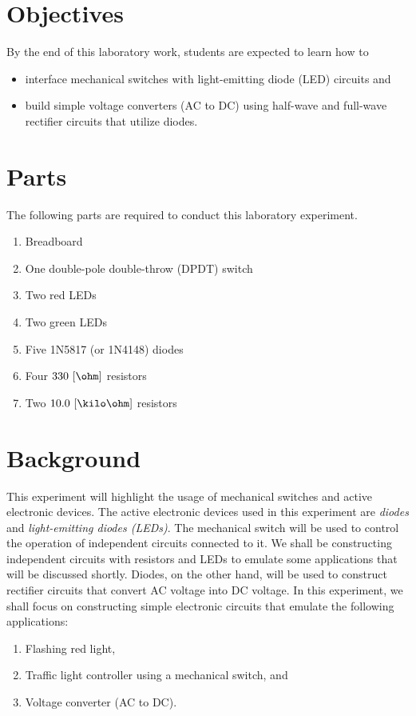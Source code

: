 \section{Objectives}
By the end of this laboratory work, students are expected to learn how to 

\begin{itemize}

\item interface mechanical switches with light-emitting diode (LED) circuits and   
  
\item build simple voltage converters (AC to DC) using half-wave and full-wave rectifier circuits that utilize diodes.  
 
  
\end{itemize}

\section{Parts}
\label{sec:partsEx8}
The following parts are required to conduct this laboratory experiment. %
%
\begin{enumerate}
\item Breadboard  
\item One double-pole double-throw (DPDT) switch
\item Two red LEDs
\item Two green LEDs
\item Five 1N5817 (or 1N4148) diodes 
\item Four $330~[\ohm]$ resistors
\item Two $10.0~[\kilo\ohm]$ resistors  
\end{enumerate}

\section{Background}
\label{sec:background}

This experiment will highlight the usage of mechanical switches and active electronic devices. The active electronic devices used in this experiment are \emph{diodes} and \emph{light-emitting diodes (LEDs)}.   The mechanical switch will be used to control the operation of independent circuits connected to it. We shall be constructing independent circuits with resistors and LEDs to emulate some applications that will be discussed shortly. Diodes, on the other hand, will be used to construct rectifier circuits that convert AC voltage into DC voltage. In this experiment, we shall focus on constructing simple electronic circuits that emulate the following applications:
%
\begin{enumerate}
    \item Flashing red light,
    \item Traffic light controller using a mechanical switch, and 
    \item Voltage converter (AC to DC).
\end{enumerate}

